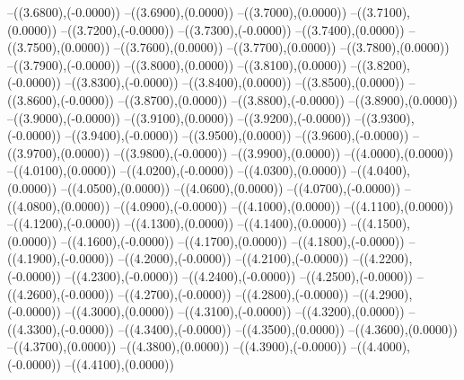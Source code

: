 {	--({\sx*(3.6800)},{\sy*(-0.0000)})
	--({\sx*(3.6900)},{\sy*(0.0000)})
	--({\sx*(3.7000)},{\sy*(0.0000)})
	--({\sx*(3.7100)},{\sy*(0.0000)})
	--({\sx*(3.7200)},{\sy*(-0.0000)})
	--({\sx*(3.7300)},{\sy*(-0.0000)})
	--({\sx*(3.7400)},{\sy*(0.0000)})
	--({\sx*(3.7500)},{\sy*(0.0000)})
	--({\sx*(3.7600)},{\sy*(0.0000)})
	--({\sx*(3.7700)},{\sy*(0.0000)})
	--({\sx*(3.7800)},{\sy*(0.0000)})
	--({\sx*(3.7900)},{\sy*(-0.0000)})
	--({\sx*(3.8000)},{\sy*(0.0000)})
	--({\sx*(3.8100)},{\sy*(0.0000)})
	--({\sx*(3.8200)},{\sy*(-0.0000)})
	--({\sx*(3.8300)},{\sy*(-0.0000)})
	--({\sx*(3.8400)},{\sy*(0.0000)})
	--({\sx*(3.8500)},{\sy*(0.0000)})
	--({\sx*(3.8600)},{\sy*(-0.0000)})
	--({\sx*(3.8700)},{\sy*(0.0000)})
	--({\sx*(3.8800)},{\sy*(-0.0000)})
	--({\sx*(3.8900)},{\sy*(0.0000)})
	--({\sx*(3.9000)},{\sy*(-0.0000)})
	--({\sx*(3.9100)},{\sy*(0.0000)})
	--({\sx*(3.9200)},{\sy*(-0.0000)})
	--({\sx*(3.9300)},{\sy*(-0.0000)})
	--({\sx*(3.9400)},{\sy*(-0.0000)})
	--({\sx*(3.9500)},{\sy*(0.0000)})
	--({\sx*(3.9600)},{\sy*(-0.0000)})
	--({\sx*(3.9700)},{\sy*(0.0000)})
	--({\sx*(3.9800)},{\sy*(-0.0000)})
	--({\sx*(3.9900)},{\sy*(0.0000)})
	--({\sx*(4.0000)},{\sy*(0.0000)})
	--({\sx*(4.0100)},{\sy*(0.0000)})
	--({\sx*(4.0200)},{\sy*(-0.0000)})
	--({\sx*(4.0300)},{\sy*(0.0000)})
	--({\sx*(4.0400)},{\sy*(0.0000)})
	--({\sx*(4.0500)},{\sy*(0.0000)})
	--({\sx*(4.0600)},{\sy*(0.0000)})
	--({\sx*(4.0700)},{\sy*(-0.0000)})
	--({\sx*(4.0800)},{\sy*(0.0000)})
	--({\sx*(4.0900)},{\sy*(-0.0000)})
	--({\sx*(4.1000)},{\sy*(0.0000)})
	--({\sx*(4.1100)},{\sy*(0.0000)})
	--({\sx*(4.1200)},{\sy*(-0.0000)})
	--({\sx*(4.1300)},{\sy*(0.0000)})
	--({\sx*(4.1400)},{\sy*(0.0000)})
	--({\sx*(4.1500)},{\sy*(0.0000)})
	--({\sx*(4.1600)},{\sy*(-0.0000)})
	--({\sx*(4.1700)},{\sy*(0.0000)})
	--({\sx*(4.1800)},{\sy*(-0.0000)})
	--({\sx*(4.1900)},{\sy*(-0.0000)})
	--({\sx*(4.2000)},{\sy*(-0.0000)})
	--({\sx*(4.2100)},{\sy*(-0.0000)})
	--({\sx*(4.2200)},{\sy*(-0.0000)})
	--({\sx*(4.2300)},{\sy*(-0.0000)})
	--({\sx*(4.2400)},{\sy*(-0.0000)})
	--({\sx*(4.2500)},{\sy*(-0.0000)})
	--({\sx*(4.2600)},{\sy*(-0.0000)})
	--({\sx*(4.2700)},{\sy*(-0.0000)})
	--({\sx*(4.2800)},{\sy*(-0.0000)})
	--({\sx*(4.2900)},{\sy*(-0.0000)})
	--({\sx*(4.3000)},{\sy*(0.0000)})
	--({\sx*(4.3100)},{\sy*(-0.0000)})
	--({\sx*(4.3200)},{\sy*(0.0000)})
	--({\sx*(4.3300)},{\sy*(-0.0000)})
	--({\sx*(4.3400)},{\sy*(-0.0000)})
	--({\sx*(4.3500)},{\sy*(0.0000)})
	--({\sx*(4.3600)},{\sy*(0.0000)})
	--({\sx*(4.3700)},{\sy*(0.0000)})
	--({\sx*(4.3800)},{\sy*(0.0000)})
	--({\sx*(4.3900)},{\sy*(-0.0000)})
	--({\sx*(4.4000)},{\sy*(-0.0000)})
	--({\sx*(4.4100)},{\sy*(0.0000)})
}
